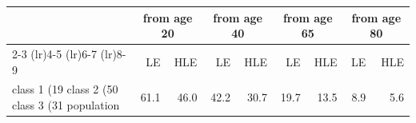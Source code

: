 \begin{tabular}{lrrrrrrrr}
\toprule
 & \multicolumn{2}{c}{from age 20} & \multicolumn{2}{c}{from age 40} & \multicolumn{2}{c}{from age 65} & \multicolumn{2}{c}{from age 80} \\
\cmidrule(lr){2-3} \cmidrule(lr){4-5} \cmidrule(lr){6-7} \cmidrule(lr){8-9}
 & LE & HLE & LE & HLE & LE & HLE & LE & HLE \\
\midrule
class 1 (19%
class 2 (50%
class 3 (31%
population & 61.1 & 46.0 & 42.2 & 30.7 & 19.7 & 13.5 & 8.9 & 5.6 \\
\bottomrule
\end{tabular}
